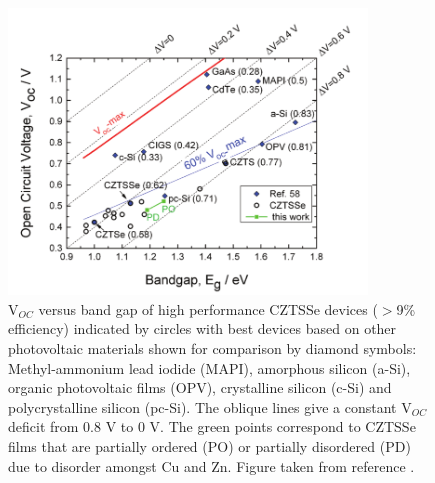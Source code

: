 \documentclass[11pt, twoside]{report}
\begin{document}
\begin{figure}[h!]
  \centering
    \includegraphics[width=0.85\textwidth]{figures/Voc.png}
    \caption[V$_{OC}$ versus band gap of high performance CZTSSe devices ($>$9\% efficiency) indicated by circles with best devices based on other photovoltaic materials shown for comparison by diamond symbols: Methyl-ammonium lead iodide (MAPI), amorphous silicon (a-Si), organic photovoltaic films (OPV), crystalline silicon (c-Si) and polycrystalline silicon (pc-Si). The oblique lines give a constant V$_{OC}$ deficit from 0.8 V to 0 V. The green points correspond to CZTSSe films that are partially ordered (PO) or partially disordered (PD) due to disorder amongst Cu and Zn.]{V$_{OC}$ versus band gap of high performance CZTSSe devices ($>$9\% efficiency) indicated by circles with best devices based on other photovoltaic materials shown for comparison by diamond symbols: Methyl-ammonium lead iodide (MAPI), amorphous silicon (a-Si), organic photovoltaic films (OPV), crystalline silicon (c-Si) and polycrystalline silicon (pc-Si). The oblique lines give a constant V$_{OC}$ deficit from 0.8 V to 0 V. The green points correspond to CZTSSe films that are partially ordered (PO) or partially disordered (PD) due to disorder amongst Cu and Zn. Figure taken from reference .}
  \label{Voc}
\end{figure}
\end{document}
